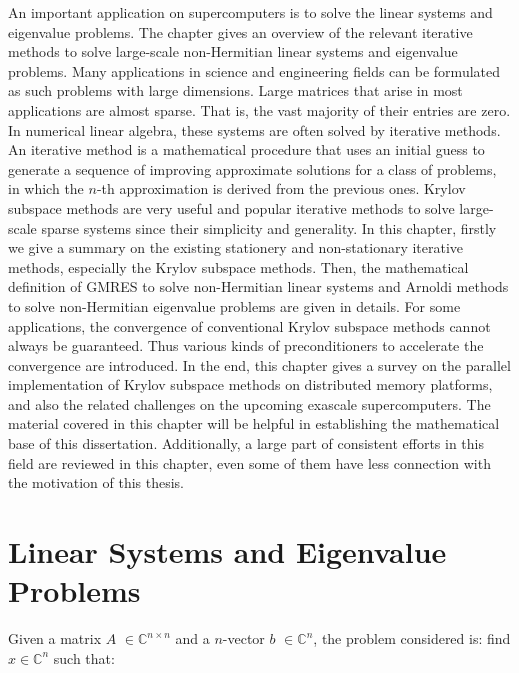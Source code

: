 \begin{displayquote}
	\textsf{An important application on supercomputers is to solve the linear systems and eigenvalue problems. The chapter gives an overview of the relevant iterative methods to solve large-scale non-Hermitian linear systems and eigenvalue problems. Many applications in science and engineering fields can be formulated as such problems with large dimensions.  Large matrices that arise in most applications are almost sparse. That is, the vast majority of their entries are zero. In numerical linear algebra, these systems are often solved by iterative methods. An iterative method is a mathematical procedure that uses an initial guess to generate a sequence of improving approximate solutions for a class of problems, in which the $n$-th approximation is derived from the previous ones. Krylov subspace methods are very useful and popular iterative methods to solve large-scale sparse systems since their simplicity and generality. In this chapter, firstly we give a summary on the existing stationery and non-stationary iterative methods, especially the Krylov subspace methods. Then, the mathematical definition of GMRES to solve non-Hermitian linear systems and Arnoldi methods to solve non-Hermitian eigenvalue problems are given in details. For some applications, the convergence of conventional Krylov subspace methods cannot always be guaranteed. Thus various kinds of preconditioners to accelerate the convergence are introduced. In the end, this chapter gives a survey on the parallel implementation of Krylov subspace methods on distributed memory platforms, and also the related challenges on the upcoming exascale supercomputers. The material covered in this chapter will be helpful in establishing the mathematical base of this dissertation. Additionally, a large part of consistent efforts in this field are reviewed in this chapter, even some of them have less connection with the motivation of this thesis.}
\end{displayquote}

\vspace{0.6in}

\section{Linear Systems and Eigenvalue Problems}

Given a matrix $A$ $\in \mathbb{C}^{n \times n}$ and a $n$-vector $b$ $\in \mathbb{C}^{n}$, the problem considered is: find $x \in \mathbb{C}^{n}$ such that:

